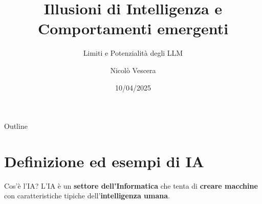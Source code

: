 \documentclass{beamer}
\title{Illusioni di Intelligenza e Comportamenti emergenti}
\subtitle{Limiti e Potenzialità degli LLM}
\author{Nicolò Vescera}
\date{10/04/2025}
\begin{document}
\begin{frame}
    \titlepage
\end{frame}

\begin{frame}{Outline}
    \tableofcontents
\end{frame}

\section{Definizione ed esempi di IA}

\begin{frame}{Cos'è l'IA?}
    \pause
    L’IA è un \textbf{settore dell’Informatica} che tenta di \textbf{creare macchine} con caratteristiche tipiche dell’\textbf{intelligenza umana}.
\end{frame}
\end{document}
